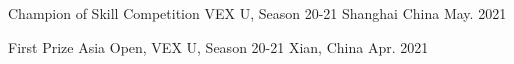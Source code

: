 \begin{cvhonors}
\cvhonor
{Champion of Skill Competition} %
{VEX U, Season 20-21} %
{Shanghai China} %
{May. 2021} %

  \cvhonor
    {First Prize} %
    { Asia Open, VEX U, Season 20-21} %
    {Xian, China} %
    {Apr. 2021} %







\end{cvhonors}



